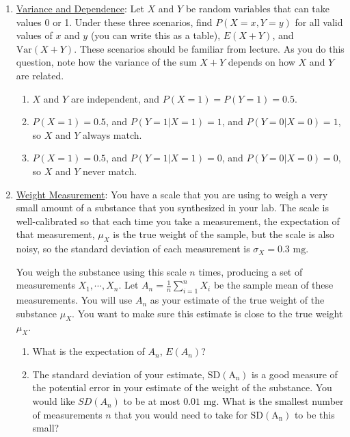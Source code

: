 \documentclass[11pt]{article}
\newcommand{\V}{\mathrm{Var}}
\begin{document}
\begin{enumerate}
\item \underline{Variance and Dependence}: Let $X$ and $Y$ be random variables that can take values 0 or 1.  Under these three scenarios, find $P(X = x, Y = y)$ for all valid values of $x$ and $y$ (you can write this as a table), $E(X + Y)$, and $\V(X+Y)$. These scenarios should be familiar from lecture. As you do this question, note how the variance of the sum $X + Y$ depends on how $X$ and $Y$ are related.
\begin{enumerate}
    \item $X$ and $Y$ are independent, and $P(X = 1) = P(Y = 1) = 0.5$.
    \item $P(X = 1) = 0.5$, and $P(Y = 1 | X = 1) = 1$, and $P(Y = 0 | X = 0) = 1$, so $X$ and $Y$ always match.
    \item $P(X = 1) = 0.5$, and $P(Y = 1 | X = 1) = 0$, and $P(Y = 0 | X = 0) = 0$, so $X$ and $Y$ never match.
\end{enumerate}

\item \underline{Weight Measurement}: You have a scale that you are using to weigh a very small amount of a substance that you synthesized in your lab. The scale is well-calibrated so that each time you take a measurement, the expectation of that measurement, $\mu_X$ is the true weight of the sample, but the scale is also noisy, so the standard deviation of each measurement is $\sigma_X = 0.3\textrm{ mg}$.

    You weigh the substance using this scale $n$ times, producing a set of measurements $X_1, \cdots, X_n$. Let $A_n = \frac{1}{n} \sum_{i=1}^n X_i$ be the sample mean of these measurements. You will use $A_n$ as your estimate of the true weight of the substance $\mu_X$. You want to make sure this estimate is close to the true weight $\mu_X$. 
    \begin{enumerate}
        \item What is the expectation of $A_n$, $E(A_n)$?
        \item The standard deviation of your estimate, $\mathrm{SD(A_n)}$ is a good measure of the potential error in your estimate of the weight of the substance. You would like $SD(A_n)$ to be at most $0.01\textrm{ mg}$. What is the smallest number of measurements $n$ that you would need to take for $\mathrm{SD(A_n)}$ to be this small?
    \end{enumerate}
\end{enumerate}
\end{document}
